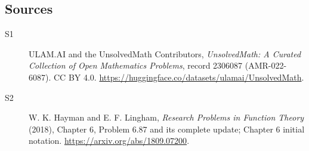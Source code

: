 \documentclass[11pt]{article}
\begin{document}
\subsection{Sources}
\begin{description}
\item[\hypertarget{source:2306087:1}{S1}] ULAM.AI and the UnsolvedMath Contributors, \emph{UnsolvedMath: A Curated Collection of Open Mathematics Problems}, record 2306087 (AMR-022-6087). CC BY 4.0. \url{https://huggingface.co/datasets/ulamai/UnsolvedMath}.
\item[\hypertarget{source:2306087:2}{S2}] W. K. Hayman and E. F. Lingham, \emph{Research Problems in Function Theory} (2018), Chapter 6, Problem 6.87 and its complete update; Chapter 6 initial notation. \url{https://arxiv.org/abs/1809.07200}.
\end{description}
\label{end:2306087}
\end{document}
